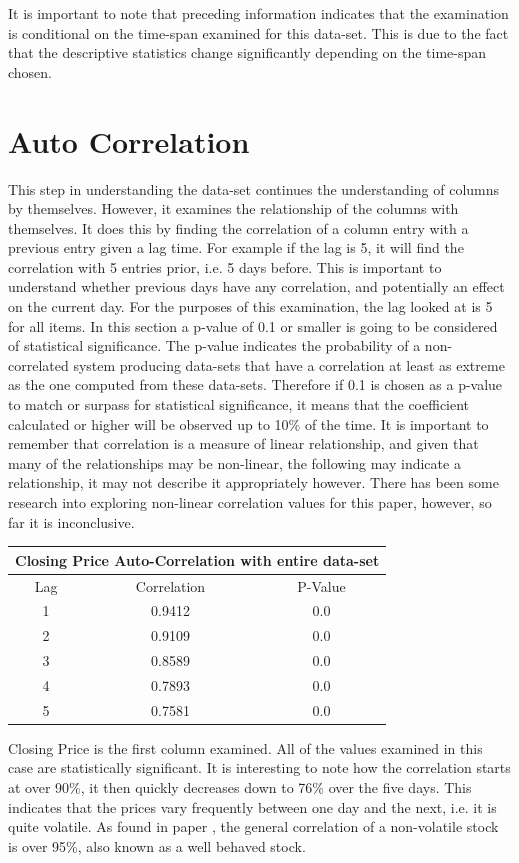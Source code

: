 It is important to note that preceding information indicates that the examination is conditional on the time-span examined for this data-set. This is due to the fact that the descriptive statistics change significantly depending on the time-span chosen.

\section{Auto Correlation}

This step in understanding the data-set continues the understanding of columns by themselves. However, it examines the relationship of the columns with themselves. It does this by finding the correlation of a column entry with a previous entry given a lag time. For example if the lag is 5, it will find the correlation with 5 entries prior, i.e. 5 days before. This is important to understand whether previous days have any correlation, and potentially an effect on the current day. For the purposes of this examination, the lag looked at is 5 for all items. In this section a p-value of 0.1 or smaller is going to be considered of statistical significance. The p-value indicates the probability of a non-correlated system producing data-sets that have a correlation at least as extreme as the one computed from these data-sets. Therefore if 0.1 is chosen as a p-value to match or surpass for statistical significance, it means that the coefficient calculated or higher will be observed up to 10\% of the time. It is important to remember that correlation is a measure of linear relationship, and given that many of the relationships may be non-linear, the following may indicate a relationship, it may not describe it appropriately however. There has been some research into exploring non-linear correlation values for this paper, however, so far it is inconclusive.

\begin{center}
\begin{tabular}{ c c c } 
\hline
\multicolumn{3}{|c|}{Closing Price Auto-Correlation with entire data-set} \\
\hline
Lag & Correlation & P-Value \\
\hline
1 & 0.9412 & 0.0 \\
2 & 0.9109 & 0.0 \\
3 & 0.8589 & 0.0 \\
4 & 0.7893 & 0.0 \\
5 & 0.7581 & 0.0 \\
\end{tabular}
\end{center}
Closing Price is the first column examined. All of the values examined in this case are statistically significant. It is interesting to note how the correlation starts at over 90\%, it then quickly decreases down to 76\% over the five days. This indicates that the prices vary frequently between one day and the next, i.e. it is quite volatile. As found in paper \cite{correlationVvolatility}, the general correlation of a non-volatile stock is over 95\%, also known as a well behaved stock.

